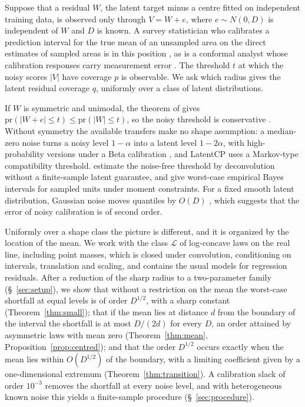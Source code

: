 \documentclass[lineno]{biometrika}
\newcommand{\pr}{\mathrm{pr}}
\newcommand{\LC}{\mathcal{L}}
\begin{document}
Suppose that a residual $W$, the latent target minus a centre fitted on independent training data, is observed only through $V = W + e$, where $e \sim N(0, D)$ is independent of $W$ and $D$ is known. A survey statistician who calibrates a prediction interval for the true mean of an unsampled area on the direct estimates of sampled areas is in this position \citep{fay1979}, as is a conformal analyst whose calibration responses carry measurement error \citep{einbinder2024, cohen2025}. The threshold $t$ at which the noisy scores $|V|$ have coverage $p$ is observable. We ask which radius gives the latent residual coverage $q$, uniformly over a class of latent distributions.

If $W$ is symmetric and unimodal, the theorem of \citet{anderson1955} gives $\pr(|W + e| \le t) \le \pr(|W| \le t)$, so the noisy threshold is conservative \citep{einbinder2024}. Without symmetry the available transfers make no shape assumption: a median-zero noise turns a noisy level $1 - \alpha$ into a latent level $1 - 2\alpha$, with high-probability versions under a Beta calibration \citep{guille2024}, and LatentCP \citep{zheng2026} uses a Markov-type compatibility threshold. \citet{cohen2025} estimate the noise-free threshold by deconvolution without a finite-sample latent guarantee, and \citet{armstrong2022} give worst-case empirical Bayes intervals for sampled units under moment constraints. For a fixed smooth latent distribution, Gaussian noise moves quantiles by $O(D)$ \citep{jochmans2024}, which suggests that the error of noisy calibration is of second order.

Uniformly over a shape class the picture is different, and it is organized by the location of the mean. We work with the class $\LC$ of log-concave laws on the real line, including point masses, which is closed under convolution, conditioning on intervals, translation and scaling, and contains the usual models for regression residuals. After a reduction of the sharp radius to a two-parameter family (\S~\ref{sec:setup}), we show that without a restriction on the mean the worst-case shortfall at equal levels is of order $D^{1/2}$, with a sharp constant (Theorem~\ref{thm:small}); that if the mean lies at distance $d$ from the boundary of the interval the shortfall is at most $D/(2d)$ for every $D$, an order attained by asymmetric laws with mean zero (Theorem~\ref{thm:mean}, Proposition~\ref{prop:centred}); and that the order $D^{1/2}$ occurs exactly when the mean lies within $O(D^{1/2})$ of the boundary, with a limiting coefficient given by a one-dimensional extremum (Theorem~\ref{thm:transition}). A calibration slack of order $10^{-3}$ removes the shortfall at every noise level, and with heterogeneous known noise this yields a finite-sample procedure (\S~\ref{sec:procedure}).
\end{document}
